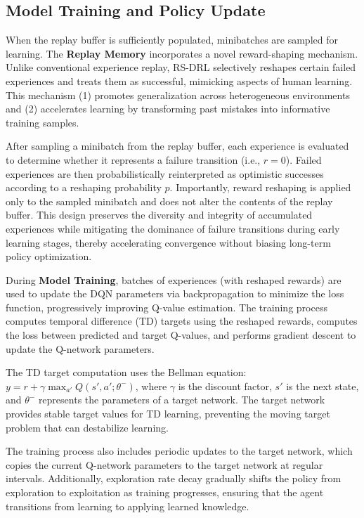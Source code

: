 \documentclass[11pt,a4paper]{article}
\begin{document}
\subsection{Model Training and Policy Update}
\label{subsec:model-training}

When the replay buffer is sufficiently populated, minibatches are sampled for learning. The \textbf{Replay Memory} incorporates a novel reward-shaping mechanism. Unlike conventional experience replay, RS-DRL selectively reshapes certain failed experiences and treats them as successful, mimicking aspects of human learning. This mechanism (1) promotes generalization across heterogeneous environments and (2) accelerates learning by transforming past mistakes into informative training samples.

After sampling a minibatch from the replay buffer, each experience is evaluated to determine whether it represents a failure transition (i.e., $r = 0$). Failed experiences are then probabilistically reinterpreted as optimistic successes according to a reshaping probability $p$. Importantly, reward reshaping is applied only to the sampled minibatch and does not alter the contents of the replay buffer. This design preserves the diversity and integrity of accumulated experiences while mitigating the dominance of failure transitions during early learning stages, thereby accelerating convergence without biasing long-term policy optimization.

During \textbf{Model Training}, batches of experiences (with reshaped rewards) are used to update the DQN parameters via backpropagation to minimize the loss function, progressively improving Q-value estimation. The training process computes temporal difference (TD) targets using the reshaped rewards, computes the loss between predicted and target Q-values, and performs gradient descent to update the Q-network parameters.

The TD target computation uses the Bellman equation: $y = r + \gamma \max_{a'} Q(s', a'; \theta^-)$, where $\gamma$ is the discount factor, $s'$ is the next state, and $\theta^-$ represents the parameters of a target network. The target network provides stable target values for TD learning, preventing the moving target problem that can destabilize learning.

The training process also includes periodic updates to the target network, which copies the current Q-network parameters to the target network at regular intervals. Additionally, exploration rate decay gradually shifts the policy from exploration to exploitation as training progresses, ensuring that the agent transitions from learning to applying learned knowledge.
\end{document}
